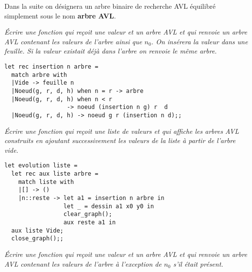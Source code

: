Dans la suite on désignera un arbre binaire de recherche AVL équilibré simplement sous le nom {\bf arbre AVL}.
\begin{Exercise}\it 
Écrire une fonction  qui reçoit une valeur et un arbre AVL et qui renvoie un arbre AVL contenant les valeurs de l'arbre ainsi que $n_0$. On insérera la valeur dans une feuille. Si la valeur existait déjà dans l'arbre on renvoie le même arbre.
\end{Exercise}
\begin{Answer} 
\begin{lstlisting}
let rec insertion n arbre = 
  match arbre with
  |Vide -> feuille n
  |Noeud(g, r, d, h) when n = r -> arbre
  |Noeud(g, r, d, h) when n < r
                  -> noeud (insertion n g) r  d
  |Noeud(g, r, d, h) -> noeud g r (insertion n d);;
\end{lstlisting}
\end{Answer}
\begin{Exercise}\it 
Écrire une fonction qui reçoit une liste de valeurs et qui affiche les arbres AVL construits en ajoutant successivement les valeurs de la liste à partir de l'arbre vide.
\end{Exercise}
\begin{Answer} 
\begin{lstlisting}
let evolution liste =
  let rec aux liste arbre =
    match liste with
    |[] -> ()
    |n::reste -> let a1 = insertion n arbre in
                 let _ = dessin a1 x0 y0 in
                 clear_graph();
                 aux reste a1 in
  aux liste Vide;
  close_graph();;
\end{lstlisting}
\end{Answer}
\begin{Exercise}\it 
Écrire une fonction  qui reçoit une valeur et un arbre AVL et qui renvoie un arbre AVL contenant les valeurs de l'arbre à l'exception de $n_0$ s'il était présent.
\end{Exercise}

